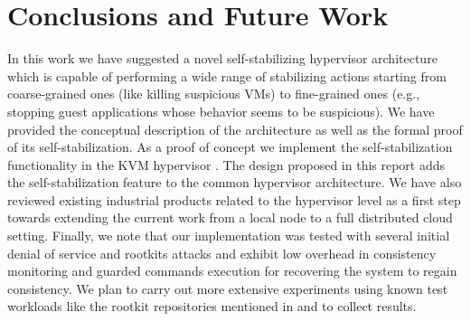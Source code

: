 
\section{\label{sec:Conclusions-and-Future-Work}Conclusions and Future Work}

In this work we have suggested a novel self-stabilizing hypervisor
architecture which is capable of performing a wide range of stabilizing
actions starting from coarse-grained ones (like killing suspicious
VMs) to fine-grained ones (e.g., stopping guest applications whose
behavior seems to be suspicious). We have provided the conceptual
description of the architecture as well as the formal proof of its
self-stabilization. As a proof of concept we implement the self-stabilization
functionality in the KVM hypervisor \cite{kvm-site}. The design proposed
in this report adds the self-stabilization feature to the common hypervisor
architecture. We have also reviewed existing industrial products related
to the hypervisor level as a first step towards extending the current
work from a local node to a full distributed cloud setting. Finally,
we note that our implementation was tested with several initial denial
of service and rootkits attacks and exhibit low overhead in consistency
monitoring and guarded commands execution for recovering the system
to regain consistency. We plan to carry out more extensive experiments
using known test workloads like the rootkit repositories mentioned
in \cite{Wang:rootkits:2009} and to collect results.

